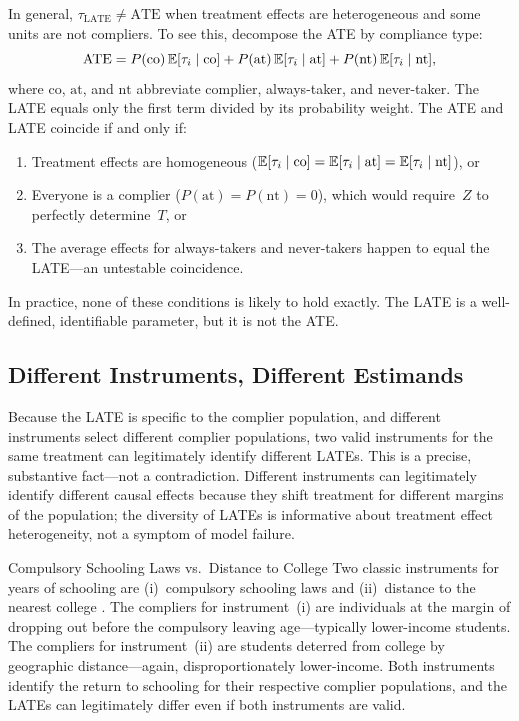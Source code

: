 \documentclass[master.tex]{subfiles}
\begin{document}
In general, $\tau_{\mathrm{LATE}} \neq \mathrm{ATE}$ when treatment
effects are heterogeneous and some units are not compliers.  To see
this, decompose the ATE by compliance type:
\[
  \mathrm{ATE}
  = P(\mathrm{co})\,\mathbb{E}[\tau_i \mid \mathrm{co}]
  + P(\mathrm{at})\,\mathbb{E}[\tau_i \mid \mathrm{at}]
  + P(\mathrm{nt})\,\mathbb{E}[\tau_i \mid \mathrm{nt}],
\]
where $\mathrm{co}$, $\mathrm{at}$, and $\mathrm{nt}$ abbreviate
complier, always-taker, and never-taker.  The LATE equals only the
first term divided by its probability weight.  The ATE and LATE
coincide if and only if:
\begin{enumerate}
  \item Treatment effects are homogeneous
    ($\mathbb{E}[\tau_i \mid \mathrm{co}] = \mathbb{E}[\tau_i \mid \mathrm{at}]
     = \mathbb{E}[\tau_i \mid \mathrm{nt}]$), or
  \item Everyone is a complier ($P(\mathrm{at}) = P(\mathrm{nt})
     = 0$), which would require~$Z$ to perfectly determine~$T$,
     or
  \item The average effects for always-takers and never-takers
    happen to equal the LATE---an untestable coincidence.
\end{enumerate}
In practice, none of these conditions is likely to hold exactly.
The LATE is a well-defined, identifiable parameter, but it is not
the ATE.

\subsection{Different Instruments, Different Estimands}
\label{w7:subsec:diff-instr}

Because the LATE is specific to the complier population, and
different instruments select different complier populations, two
valid instruments for the same treatment can legitimately identify
different LATEs.  This is a precise, substantive fact---not a
contradiction.  Different instruments can legitimately identify
different causal effects because they shift treatment for different
margins of the population; the diversity of LATEs is informative
about treatment effect heterogeneity, not a symptom of model
failure.

\begin{example}{Compulsory Schooling Laws vs.\ Distance to College}
\label{w7:ex:late-comparison}
Two classic instruments for years of schooling are (i)~compulsory
schooling laws \citep{angrist1991does} and (ii)~distance to the nearest
college \citep{card1995using}.  The compliers for instrument~(i) are
individuals at the margin of dropping out before the compulsory
leaving age---typically lower-income students.  The compliers
for instrument~(ii) are students deterred from college by
geographic distance---again, disproportionately lower-income.
Both instruments identify the return to schooling for their
respective complier populations, and the LATEs can legitimately
differ even if both instruments are valid.
\end{example}
\end{document}
